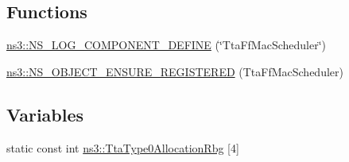 \subsection*{Functions}
\begin{DoxyCompactItemize}
\item 
\hyperlink{namespacens3_a7bc865d5fbf49063857be435f69c6434}{ns3\+::\+N\+S\+\_\+\+L\+O\+G\+\_\+\+C\+O\+M\+P\+O\+N\+E\+N\+T\+\_\+\+D\+E\+F\+I\+NE} (\char`\"{}Tta\+Ff\+Mac\+Scheduler\char`\"{})
\item 
\hyperlink{namespacens3_afdde24fbc3dd33a8c652de0e3c635768}{ns3\+::\+N\+S\+\_\+\+O\+B\+J\+E\+C\+T\+\_\+\+E\+N\+S\+U\+R\+E\+\_\+\+R\+E\+G\+I\+S\+T\+E\+R\+ED} (Tta\+Ff\+Mac\+Scheduler)
\end{DoxyCompactItemize}
\subsection*{Variables}
\begin{DoxyCompactItemize}
\item 
static const int \hyperlink{namespacens3_abfc91a5f143f78c6830c067c35fdc7b4}{ns3\+::\+Tta\+Type0\+Allocation\+Rbg} \mbox{[}4\mbox{]}
\end{DoxyCompactItemize}
